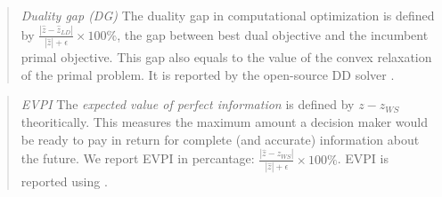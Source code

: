 %

\begin{quote}
\noindent\textit{Duality gap (DG)} The duality gap in computational optimization is defined by $\frac{|\hat{z}-\hat{z}_{LD}|}{|\hat{z}|+\epsilon}\times 100\%$, the gap between best dual objective and the incumbent primal objective. This gap also equals to the value of the convex relaxation of the primal problem. It is reported by the open-source DD solver \dsp. 
\end{quote}

\begin{quote}
\noindent\textit{EVPI} The \textit{expected value of perfect information} is defined by $z-z_{WS}$ theoritically. This measures the maximum amount a decision maker would be ready to pay in return for complete (and accurate) information about the future.  We report EVPI in percantage: $\frac{|\hat{z}-\hat{z}_{WS}|}{|\hat{z}|+\epsilon}\times 100\%$. EVPI is reported using \cplex.
\end{quote}



